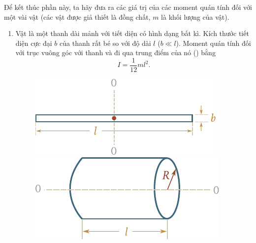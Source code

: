 Để kết thúc phần này, ta hãy đưa ra các giá trị của các moment quán tính đối với một vài vật (các vật được giả thiết là đồng chất, $m$ là khối lượng của vật).
\begin{enumerate}[1.]
	\item Vật là một thanh dài mảnh với tiết diện có hình dạng bất kì. Kích thước tiết diện cực đại $b$ của thanh rất bé so với độ dài $l$ ($b \ll l$). Moment quán tính đối với trục vuông góc với thanh và đi qua trung điểm của nó () bằng %
	\begin{equation}\label{eq:5_25}
	I = \frac{1}{12}ml^2.
	\end{equation}
	
	\begin{figure}[!htb]
	\begin{minipage}[t]{0.5\linewidth}
		\begin{center}
			\includegraphics[scale=0.95]{figures/ch_05/fig_5_13.pdf}
			\caption[]{}
			\label{fig:5_13}
		\end{center}
	\end{minipage}
	\hspace{-0.05cm}
	\begin{minipage}[t]{0.5\linewidth}
		\begin{center}
			\includegraphics[scale=0.9]{figures/ch_05/fig_5_14.pdf}
			\caption[]{}
			\label{fig:5_14}
		\end{center}
	\end{minipage}
\end{figure}


\end{enumerate}
